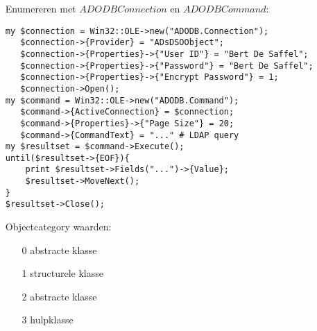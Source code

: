 \documentclass{report}
\begin{document}
\begin{itemize}
    \item[\info] Enumereren met $ADODBConnection$ en $ADODBCommand$:
    \begin{lstlisting}
my $connection = Win32::OLE->new("ADODB.Connection");
   $connection->{Provider} = "ADsDSOObject";
   $connection->{Properties}->{"User ID"} = "Bert De Saffel";
   $connection->{Properties}->{"Password"} = "Bert De Saffel";
   $connection->{Properties}->{"Encrypt Password"} = 1;
   $connection->Open();
my $command = Win32::OLE->new("ADODB.Command");
   $command->{ActiveConnection} = $connection;
   $command->{Properties}->{"Page Size"} = 20;
   $command->{CommandText} = "..." # LDAP query
my $resultset = $command->Execute();
until($resultset->{EOF}){
    print $resultset->Fields("...")->{Value};
    $resultset->MoveNext();
}
$resultset->Close();
    \end{lstlisting}
    \item[\info] Objectcategory waarden:
    \begin{enumerate}
        \item[0] abstracte klasse
        \item[1] structurele klasse
        \item[2] abstracte klasse
        \item[3] hulpklasse
    \end{enumerate}
\end{itemize}
\end{document}
